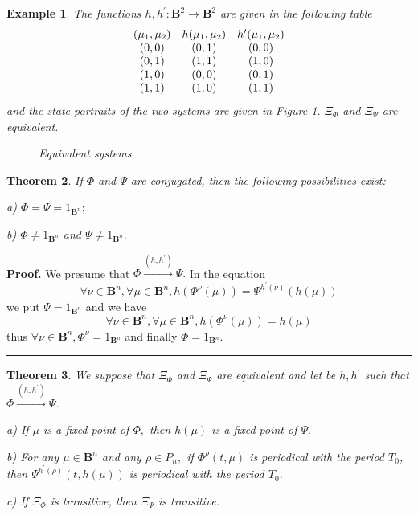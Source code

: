 \documentclass[12pt]{article}\usepackage{amsmath}
\newtheorem{theorem}{Theorem}
\newtheorem{example}[theorem]{Example}
\newenvironment{proof}[1][Proof]{\textbf{#1.} }{\ \rule{0.5em}{0.5em}}
\begin{document}
\begin{example}
The functions $h,h^{\prime}:\mathbf{B}^{2}\rightarrow\mathbf{B}^{2}$ are given
in the following table\[\begin{array}
[c]{ccc}(\mu_{1},\mu_{2}) & h(\mu_{1},\mu_{2}) & h^{\prime}(\mu_{1},\mu_{2})\\
(0,0) & (0,1) & (0,0)\\
(0,1) & (1,1) & (1,0)\\
(1,0) & (0,0) & (0,1)\\
(1,1) & (1,0) & (1,1)
\end{array}
\]
and the state portraits of the two systems are given in Figure \ref{echiv2}.
$\Xi_{\Phi}$ and $\Xi_{\Psi}$ are equivalent.\begin{figure}
[ptb]
\begin{center}
\caption{Equivalent systems}\label{echiv2}\end{center}
\end{figure}

\end{example}

\begin{theorem}
If $\Phi$ and $\Psi$ are conjugated, then the following possibilities exist:

a) $\Phi=\Psi=1_{\mathbf{B}^{n}};$

b) $\Phi\neq1_{\mathbf{B}^{n}}$ and $\Psi\neq1_{\mathbf{B}^{n}}.$
\end{theorem}

\begin{proof}
We presume that $\Phi\overset{(h,h^{\prime})}{\rightarrow}\Psi.$ In the
equation\[
\forall\nu\in\mathbf{B}^{n},\forall\mu\in\mathbf{B}^{n},h(\Phi^{\nu}(\mu))=\Psi^{h^{\prime}(\nu)}(h(\mu))
\]
we put $\Psi=1_{\mathbf{B}^{n}}$ and we have\[
\forall\nu\in\mathbf{B}^{n},\forall\mu\in\mathbf{B}^{n},h(\Phi^{\nu}(\mu))=h(\mu)
\]
thus $\forall\nu\in\mathbf{B}^{n},\Phi^{\nu}=1_{\mathbf{B}^{n}}$ and finally
$\Phi=1_{\mathbf{B}^{n}}.$
\end{proof}

\begin{theorem}
We suppose that $\Xi_{\Phi}$ and $\Xi_{\Psi}$ are equivalent and let be
$h,h^{\prime}$ such that $\Phi\overset{(h,h^{\prime})}{\rightarrow}\Psi$.

a) If $\mu$ is a fixed point of $\Phi,$ then $h(\mu)$ is a fixed point of
$\Psi.$

b) For any $\mu\in\mathbf{B}^{n}$ and any $\rho\in P_{n},$ if $\Phi^{\rho
}(t,\mu)$ is periodical with the period $T_{0}$, then $\Psi^{h^{\prime}(\rho
)}(t,h(\mu))$ is periodical with the period $T_{0}$.

c) If $\Xi_{\Phi}$ is transitive, then $\Xi_{\Psi}$ is transitive.
\end{theorem}
\end{document}
